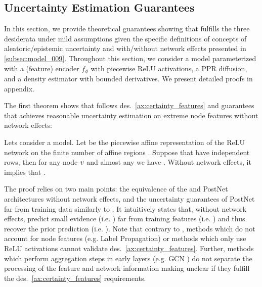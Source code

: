 \subsection{Uncertainty Estimation Guarantees} 
\label{sec:guarantees_009}

In this section, we provide theoretical guarantees showing that \GPNacro{} fulfills the three desiderata under mild assumptions given the specific definitions of concepts of aleatoric/epistemic uncertainty and with/without network effects presented in \cref{subsec:model_009}. Throughout this section, we consider a \GPNacro{} model parameterized with a (feature) encoder $f_{\phi}$ with piecewise ReLU activations, a PPR diffusion, and a density estimator  with bounded derivatives. We present detailed proofs in appendix. 

The first theorem shows that \GPNacro{} follows des.~\ref{ax:certainty_features} and guarantees that \GPNacro{} achieves reasonable uncertainty estimation on extreme node features without network effects:
\begin{theorem}
\label{thm:axiom-feature}
Lets consider a \GPNacro{} model. Let  be the piecewise affine representation of the ReLU network  on the finite number of affine regions  \cite{understanding-nn-relu}. Suppose that  have independent rows, then for any node $v$ and almost any \smash{$\x\nodeidxv$} we have . Without network effects, it implies that .
\end{theorem}
The proof relies on two main points: the equivalence of the \GPNacro{} and PostNet architectures without network effects, and the uncertainty guarantees of PostNet far from training data similarly to \cite{NatPN2021}. It intuitively states that, without network effects, \GPNacro{} predict small evidence (i.e. ) far from training features (i.e. \smash{$||\delta \cdot \x\nodeidxv|| \rightarrow \infty$}) and thus recover the prior prediction (i.e. ). 
Note that contrary to \GPNacro{}, methods which do not account for node features (e.g. Label Propagation) or methods which only use ReLU activations \cite{overconfident-relu} cannot validate des.~\ref{ax:certainty_features}. Further, methods which perform aggregation steps in early layers (e.g. GCN \citep{Kipf2016}) do not separate the processing of the feature and network information making unclear if they fulfill the des.~\ref{ax:certainty_features} requirements. 

